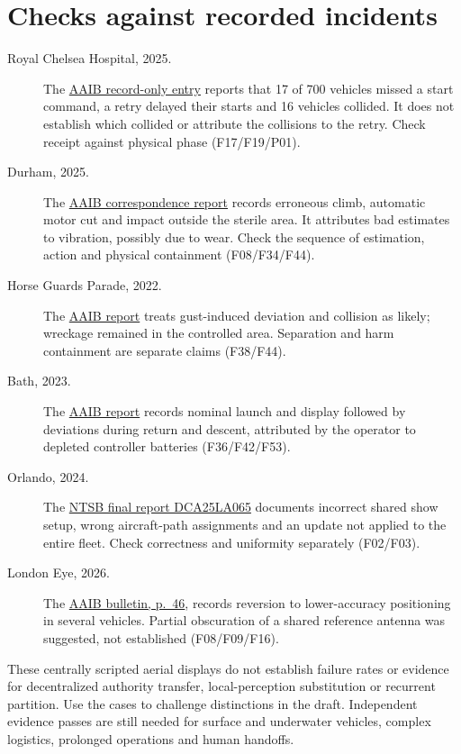 \documentclass[11pt]{article}
\begin{document}
\section{Checks against recorded incidents}
\begin{description}
\item[Royal Chelsea Hospital, 2025.] The \href{https://www.gov.uk/government/publications/aaib-record-only-investigations-reviewed-august-september-2025/aaib-record-only-investigations-reviewed-august-september-2025}{AAIB record-only entry} reports that 17 of 700 vehicles missed a start command, a retry delayed their starts and 16 vehicles collided. It does not establish which collided or attribute the collisions to the retry. Check receipt against physical phase (F17/F19/P01).
\item[Durham, 2025.] The \href{https://www.gov.uk/aaib-reports/aaib-investigation-to-uvify-ifo-uas-reg-n-slash-a}{AAIB correspondence report} records erroneous climb, automatic motor cut and impact outside the sterile area. It attributes bad estimates to vibration, possibly due to wear. Check the sequence of estimation, action and physical containment (F08/F34/F44).
\item[Horse Guards Parade, 2022.] The \href{https://www.gov.uk/aaib-reports/aaib-investigation-to-uvify-ifo-1-and-uvify-ifo-2-uas-registrations-n-slash-a}{AAIB report} treats gust-induced deviation and collision as likely; wreckage remained in the controlled area. Separation and harm containment are separate claims (F38/F44).
\item[Bath, 2023.] The \href{https://www.gov.uk/aaib-reports/aaib-investigation-to-uas-uvify-ifo}{AAIB report} records nominal launch and display followed by deviations during return and descent, attributed by the operator to depleted controller batteries (F36/F42/F53).
\item[Orlando, 2024.] The \href{https://data.ntsb.gov/carol-repgen/api/Aviation/ReportMain/GenerateFinalReport/199458/pdf}{NTSB final report DCA25LA065} documents incorrect shared show setup, wrong aircraft-path assignments and an update not applied to the entire fleet. Check correctness and uniformity separately (F02/F03).
\item[London Eye, 2026.] The \href{https://assets.publishing.service.gov.uk/media/6a7c7d41aadaaddf89b6e4da/AAIB_Bulletin_8-2026.pdf}{AAIB bulletin, p.\ 46}, records reversion to lower-accuracy positioning in several vehicles. Partial obscuration of a shared reference antenna was suggested, not established (F08/F09/F16).
\end{description}
These centrally scripted aerial displays do not establish failure rates or evidence for decentralized authority transfer, local-perception substitution or recurrent partition. Use the cases to challenge distinctions in the draft. Independent evidence passes are still needed for surface and underwater vehicles, complex logistics, prolonged operations and human handoffs.
\end{document}
